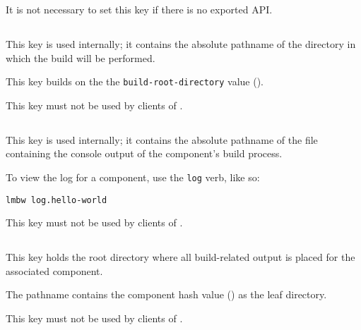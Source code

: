 It is not necessary to set this key if there is no exported API.


\subsection{}\label{variables:build-directory}

This key is used internally; it contains the absolute pathname of the
directory in which the build will be performed.

This key builds on the the \texttt{build-root-directory} value
().

This key must not be used by clients of \lmsbw.


\subsection{}\label{variables:build-log}

This key is used internally; it contains the absolute pathname of the
file containing the console output of the component's build process.

To view the log for a component, use the \texttt{log} verb, like so:

\begin{verbatim}
lmbw log.hello-world
\end{verbatim}

This key must not be used by clients of \lmsbw.


\subsection{}\label{variables:build-root-directory}

This key holds the root directory where all build-related output is
placed for the associated component.

The pathname contains the component hash value ()
as the leaf directory.

This key must not be used by clients of \lmsbw.


\subsection{}\label{variables:build-target}

